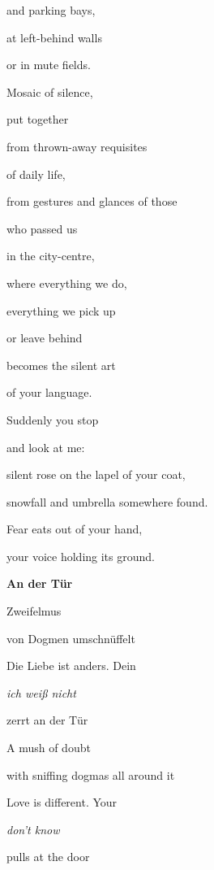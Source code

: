 \documentclass[a4paper]{article}
\begin{document}
and parking bays, 


\bigskip

at left-behind walls

or in mute fields.

Mosaic of silence, 

put together


\bigskip

from thrown-away requisites 

of daily life, 

from gestures and glances of those

who passed us


\bigskip

in the city-centre, 

where everything we do,

everything we pick up 

or leave behind


\bigskip

becomes the silent art

of your language. 

Suddenly you stop 

and look at me:


\bigskip

silent rose on the lapel of your coat,

snowfall and umbrella somewhere found.

Fear eats out of your hand,

your voice holding its ground.

\clearpage
\bigskip


\bigskip

{\bfseries
An der Tür}


\bigskip

Zweifelmus

von Dogmen umschnüffelt

Die Liebe ist anders. Dein

{\itshape
ich weiß nicht}

zerrt an der Tür



\bigskip

A mush of doubt

with sniffing dogmas all around it

Love is different. Your

{\itshape
don't know}

pulls at the door

\end{document}
